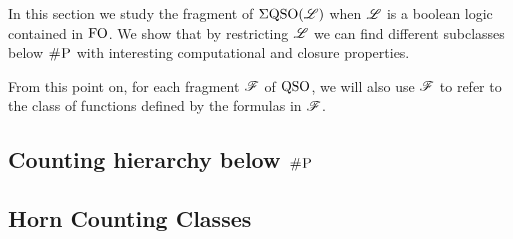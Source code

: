 
In this section we study the fragment of $\Sigma{\rm QSO}(\mathscr{L})$ when $\mathscr{L}$ is a boolean logic contained in ${\rm FO}$. We show that by restricting $\mathscr{L}$ we can find different subclasses below $\text{\sc \#P}$ with interesting computational and closure properties. 

From this point on, for each fragment $\mathscr{F}$ of ${\rm QSO}$, we will also use $\mathscr{F}$ to refer to the class of functions defined by the formulas in $\mathscr{F}$.

\subsection{Counting hierarchy below $\text{\sc \#P}$}


\subsection{Horn Counting Classes}


